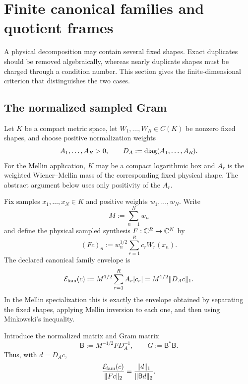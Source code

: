 \section{Finite canonical families and quotient frames}
\label{sec:tpc51-quotient-frames}

A physical decomposition may contain several fixed shapes.  Exact
duplicates should be removed algebraically, whereas nearly duplicate
shapes must be charged through a condition number.  This section gives
the finite-dimensional criterion that distinguishes the two cases.

\subsection{The normalized sampled Gram}

Let \(K\) be a compact metric space, let
\(W_1,\ldots,W_R\in C(K)\) be nonzero fixed shapes, and choose positive
normalization weights
\begin{equation}
 A_1,\ldots,A_R>0,
 \qquad
 D_A:=\operatorname{diag}(A_1,\ldots,A_R).
 \label{eq:tpc51-family-normalizations}
\end{equation}
For the Mellin application, \(K\) may be a compact logarithmic box and
\(A_r\) is the weighted Wiener--Mellin mass of the corresponding fixed
physical shape.  The abstract argument below uses only positivity of
the \(A_r\).

Fix samples \(x_1,\ldots,x_N\in K\) and positive weights
\(w_1,\ldots,w_N\).  Write
\begin{equation}
 M:=\sum_{n=1}^Nw_n
 \label{eq:tpc51-total-sample-mass}
\end{equation}
and define the physical sampled synthesis \(F:\mathbb C^R\to\mathbb C^N\) by
\begin{equation}
 (Fc)_n
 :=w_n^{1/2}\sum_{r=1}^Rc_rW_r(x_n).
 \label{eq:tpc51-family-synthesis}
\end{equation}
The declared canonical family envelope is
\begin{equation}
 \mathcal E_{\mathrm{fam}}(c)
 :=M^{1/2}\sum_{r=1}^RA_r|c_r|
 =M^{1/2}\|D_Ac\|_1.
 \label{eq:tpc51-family-envelope}
\end{equation}
In the Mellin specialization this is exactly the envelope obtained by
separating the fixed shapes, applying Mellin inversion to each one, and
then using Minkowski's inequality.

Introduce the normalized matrix and Gram matrix
\begin{equation}
 \mathsf B:=M^{-1/2}FD_A^{-1},
 \qquad
 G:=\mathsf B^*\mathsf B.
 \label{eq:tpc51-normalized-Gram}
\end{equation}
Thus, with \(d=D_Ac\),
\begin{equation}
 \frac{\mathcal E_{\mathrm{fam}}(c)}{\|Fc\|_2}
 =\frac{\|d\|_1}{\|\mathsf Bd\|_2}.
 \label{eq:tpc51-family-condition-reduction}
\end{equation}

